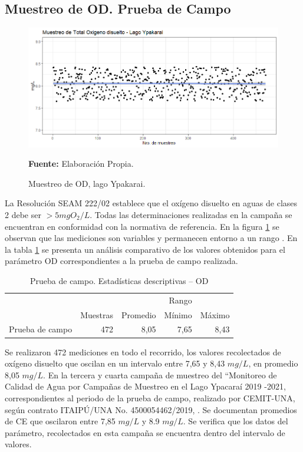 \subsection{Muestreo de OD. Prueba de Campo}

\begin{figure}[H]
        \centering
        \includegraphics[width=0.75\linewidth]{Imagenes/cap4/OD_Lago Ypakarai.png}
        \caption {Muestreo de OD, lago Ypakarai.}{\textbf{Fuente:}
        Elaboraci\'on Propia. }
        \label{fig:Lago_od}
\end{figure}

La Resoluci\'on SEAM 222/02 establece que el ox\'igeno disuelto en aguas de clases 2 debe ser  $> 5 mg O_2/L$. Todas las determinaciones realizadas en la campa\~na se encuentran en conformidad con la normativa de referencia. En la figura \ref{fig:Lago_od} se observan que las mediciones son variables y  permanecen entorno a un rango . 
En la tabla \ref{table:Lago_od} se presenta un an\'alisis comparativo de los valores obtenidos para el par\'ametro OD correspondientes a la prueba de campo  realizada.

\begin{table}[H]
\centering
\caption{Prueba de campo. Estadísticas descriptivas – OD}
\label{table:Lago_od}
\begin{tabular}{lrrrr}
\toprule
          & \multicolumn{3}{r}{Rango} \\ \cline{4-5}
          & Muestras & Promedio & Mínimo & Máximo \\
\midrule
Prueba de campo  &      472 &     8,05 &   7,65 &   8,43 \\
\bottomrule
\end{tabular}
\end{table}

Se realizaron 472 mediciones en todo el recorrido, los valores recolectados de ox\'igeno disuelto que oscilan en  un intervalo entre 7,65   y 8,43 $mg/L$, en promedio 8,05 $mg/L$.
En la tercera y cuarta campaña de muestreo del “Monitoreo de Calidad de Agua por Campañas de Muestreo en el Lago Ypacaraí 2019 -2021, correspondientes al periodo de la prueba de campo, realizado por CEMIT-UNA, seg\'un contrato ITAIPÚ/UNA No. 4500054462/2019, \cite{3er_Cemit}\cite{4to_Cemit}. Se documentan promedios de CE que oscilaron entre 7,85 $mg/L$ y 8.9 $mg/L$. 
Se verifica que los datos del par\'ametro, recolectados en esta campa\~na se encuentra dentro del intervalo de valores.

